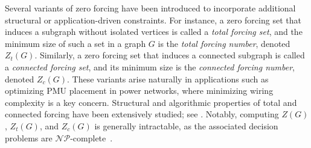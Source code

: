 \documentclass[11pt]{article}
\theoremstyle{definition}
\newcommand{\1}{\vspace{0.1cm}}
\newcommand{\2}{\vspace{0.2cm}}
\newcommand{\3}{\vspace{0.3cm}}
\begin{document}


Several variants of zero forcing have been introduced to incorporate additional structural or application-driven constraints. For instance, a zero forcing set that induces a subgraph without isolated vertices is called a \emph{total forcing set}, and the minimum size of such a set in a graph $G$ is the \emph{total forcing number}, denoted $Z_t(G)$. Similarly, a zero forcing set that induces a connected subgraph is called a \emph{connected forcing set}, and its minimum size is the \emph{connected forcing number}, denoted $Z_c(G)$. These variants arise naturally in applications such as optimizing PMU placement in power networks, where minimizing wiring complexity is a key concern. Structural and algorithmic properties of total and connected forcing have been extensively studied; see \cite{BrDa, cf-complexity, Da-19, DaHe19c, DaHe19a, DaHe19b, Da-connected-forcing, new-connected-zero-forcing}. Notably, computing $Z(G)$, $Z_t(G)$, and $Z_c(G)$ is generally intractable, as the associated decision problems are $\mathcal{NP}$-complete~\cite{NP-Complete, Da-19, DaHe19b}.

\end{document}
